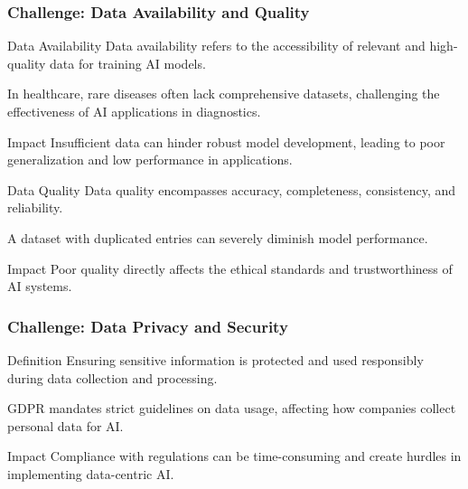 \documentclass[aspectratio=169]{beamer}
\begin{document}
\begin{frame}[fragile]
    \frametitle{Challenge: Data Availability and Quality}
    \begin{block}{Data Availability}
        Data availability refers to the accessibility of relevant and high-quality data for training AI models.
    \end{block}
    \begin{example}
        In healthcare, rare diseases often lack comprehensive datasets, challenging the effectiveness of AI applications in diagnostics.
    \end{example}
    \begin{block}{Impact}
        Insufficient data can hinder robust model development, leading to poor generalization and low performance in applications.
    \end{block}
    
    \begin{block}{Data Quality}
        Data quality encompasses accuracy, completeness, consistency, and reliability.
    \end{block}
    \begin{example}
        A dataset with duplicated entries can severely diminish model performance.
    \end{example}
    \begin{block}{Impact}
        Poor quality directly affects the ethical standards and trustworthiness of AI systems.
    \end{block}
\end{frame}

\begin{frame}[fragile]
    \frametitle{Challenge: Data Privacy and Security}
    \begin{block}{Definition}
        Ensuring sensitive information is protected and used responsibly during data collection and processing.
    \end{block}
    \begin{example}
        GDPR mandates strict guidelines on data usage, affecting how companies collect personal data for AI.
    \end{example}
    \begin{block}{Impact}
        Compliance with regulations can be time-consuming and create hurdles in implementing data-centric AI.
    \end{block}
\end{frame}
\end{document}
